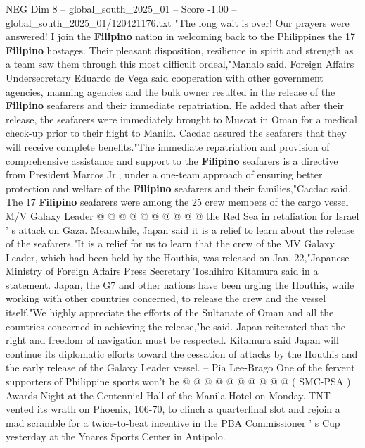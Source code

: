 \begin{textsample}{NEG Dim 8 – global\_south\_2025\_01 – Score -1.00 – global\_south\_2025\_01/120421176.txt}  \label{ex:f8_neg_333}
"The long wait is over!
Our prayers were answered!
I join the \textbf{Filipino} nation in welcoming back to the Philippines the 17 \textbf{Filipino} hostages.
Their pleasant disposition, resilience in spirit and strength as a team saw them through this most difficult ordeal,"Manalo said.
Foreign Affairs Undersecretary Eduardo de Vega said cooperation with other government agencies, manning agencies and the bulk owner resulted in the release of the \textbf{Filipino} seafarers and their immediate repatriation.
He added that after their release, the seafarers were immediately brought to Muscat in Oman for a medical check-up prior to their flight to Manila.
Cacdac assured the seafarers that they will receive complete benefits."The immediate repatriation and provision of comprehensive assistance and support to the \textbf{Filipino} seafarers is a directive from President Marcos Jr., under a one-team approach of ensuring better protection and welfare of the \textbf{Filipino} seafarers and their families,"Cacdac said.
The 17 \textbf{Filipino} seafarers were among the 25 crew members of the cargo vessel M/V Galaxy Leader @ @ @ @ @ @ @ @ @ @ the Red Sea in retaliation for Israel ' s attack on Gaza.
Meanwhile, Japan said it is a relief to learn about the release of the seafarers."It is a relief for us to learn that the crew of the MV Galaxy Leader, which had been held by the Houthis, was released on Jan. 22,"Japanese Ministry of Foreign Affairs Press Secretary Toshihiro Kitamura said in a statement.
Japan, the G7 and other nations have been urging the Houthis, while working with other countries concerned, to release the crew and the vessel itself."We highly appreciate the efforts of the Sultanate of Oman and all the countries concerned in achieving the release,"he said.
Japan reiterated that the right and freedom of navigation must be respected.
Kitamura said Japan will continue its diplomatic efforts toward the cessation of attacks by the Houthis and the early release of the Galaxy Leader vessel. -- Pia Lee-Brago One of the fervent supporters of Philippine sports won't be @ @ @ @ @ @ @ @ @ @ ( SMC-PSA ) Awards Night at the Centennial Hall of the Manila Hotel on Monday.
TNT vented its wrath on Phoenix, 106-70, to clinch a quarterfinal slot and rejoin a mad scramble for a twice-to-beat incentive in the PBA Commissioner ' s Cup yesterday at the Ynares Sports Center in Antipolo.

\end{textsample}
